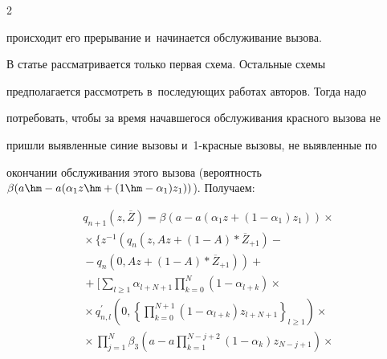 \begin{multicols}{2}
\begin{enumerate}[1.]
происходит его прерывание и~начинается обслуживание вызова.


  \end{enumerate}


  


  В статье рассматривается только первая схема. Остальные схемы 


предполагается рассмотреть в~после\-ду\-ющих работах авторов. Тогда надо 


потребовать, чтобы за время начавшегося обслуживания красного вызова не 


пришли выявленные синие вызовы и~1-крас\-ные вызовы, не выявленные по 


окончании обслуживания этого вызова (вероятность $\beta(a\hm- 


a(\alpha_1z\hm+(1\hm- \alpha_1)z_1))$). Получаем:


  \begin{multline*}


  q_{n+1} \left(z,\overline{Z}\right) =


  \beta\left(a-a\left( \alpha_1 z+\left( 1-


\alpha_1\right) z_1\right)\right)\times{}\\


{}\times


  \Bigg\{ z^{-1} \left( q_n \left(z, Az+(1-A)*\overline{Z}_{+1}\right)\right.-{}\\


  \left.{}-


  q_n\left(0,Az+(1-A)*\overline{Z}_{+1}\right)\right)+{}\\


  {}+\Bigg[


  \sum\limits_{l\geq1} \alpha_{l+N+1}\prod\limits^N_{k=0} \left(1-


\alpha_{l+k}\right)\times{} \\


  {}\times


  q^\prime_{n,l} \left(0, \left\{ \prod\limits_{k=0}^{N+1} \left(1-


\alpha_{l+k}\right) z_{l+N+1}\right\}_{l\geq1}\right) \times{}\\


{}\times \prod\limits^N_{j=1} \beta_3 


\left( a-a\prod\limits_{k=1}^{N-j+2}\left( 1-\alpha_k\right) z_{N-j+1}\right)\times{}


  \end{multline*}



\end{multicols}
